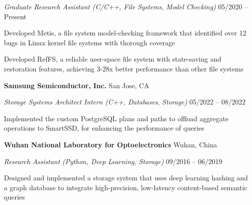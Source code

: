 \documentclass[a4paper,10pt,oneside]{article}
\begin{document}
\begin{body}
\emph{Graduate Research Assistant (C/C++, File Systems, Model Checking)}
\hfill
05/2020 --
Present

\GapNoBreak
\BulletItem
Developed Metis, a file system model-checking framework that identified over 12 bugs in Linux kernel file systems with thorough coverage 

\GapNoBreak
\BulletItem
Developed RefFS, a reliable user-space file system with state-saving and restoration features, achieving 3-28x better performance than other file systems 


\GapNoBreak

{\textbf{Samsung Semiconductor, Inc.}}
\hfill
San Jose, CA

\emph{Storage Systems Architect Intern (C++, Databases, Storage)}
\hfill
05/2022 --
08/2022

\GapNoBreak
\BulletItem
Implemented the custom PostgreSQL plans and paths to offload aggregate operations to SmartSSD, for enhancing the performance of queries





\GapNoBreak
{\textbf{Wuhan National Laboratory for Optoelectronics}}
\hfill
Wuhan, China

\emph{Research Assistant (Python, Deep Learning, Storage)}
\hfill
09/2016 --
06/2019

\GapNoBreak
\BulletItem
Designed and implemented a storage system that uses deep learning hashing and a graph database to integrate high-precision, low-latency content-based semantic queries 


\end{body}
\end{document}
